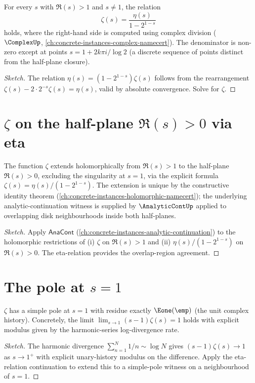 \begin{theorem}
\label{thm:eta-relation-zeta}
For every \(s\) with \(\Re(s) > 1\) and \(s \neq 1\), the relation
$$\zeta(s) = \frac{\eta(s)}{1 - 2^{1-s}}$$
holds, where the right-hand side is computed using complex division (\(\ComplexUp\), \autoref{ch:concrete-instances-complex-namecert}). The denominator is non-zero except at points \(s = 1 + 2k\pi i / \log 2\) (a discrete sequence of points distinct from the half-plane closure).
\end{theorem}
\begin{proof}[Sketch]
The relation \(\eta(s) = (1 - 2^{1-s}) \zeta(s)\) follows from the rearrangement \(\zeta(s) - 2 \cdot 2^{-s} \zeta(s) = \eta(s)\), valid by absolute convergence. Solve for \(\zeta\).
\end{proof}

\section{\(\zeta\) on the half-plane \(\Re(s) > 0\) via eta}

\begin{theorem}[\(\zeta\) on \(\Re(s) > 0\)]
\label{thm:zeta-on-positive-half-plane}
The function \(\zeta\) extends holomorphically from \(\Re(s) > 1\) to the half-plane \(\Re(s) > 0\), excluding the singularity at \(s = 1\), via the explicit formula \(\zeta(s) = \eta(s) / (1 - 2^{1-s})\). The extension is unique by the constructive identity theorem (\autoref{ch:concrete-instances-holomorphic-namecert}); the underlying analytic-continuation witness is supplied by \(\AnalyticContUp\) applied to overlapping disk neighbourhoods inside both half-planes.
\end{theorem}
\begin{proof}[Sketch]
Apply \(\mathsf{AnaCont}\) (\autoref{ch:concrete-instances-analytic-continuation}) to the holomorphic restrictions of (i) \(\zeta\) on \(\Re(s) > 1\) and (ii) \(\eta(s)/(1 - 2^{1-s})\) on \(\Re(s) > 0\). The eta-relation provides the overlap-region agreement.
\end{proof}

\section{The pole at \(s = 1\)}

\begin{theorem}[Simple pole at \(s = 1\) with residue 1]
\label{thm:pole-at-one-residue}
\(\zeta\) has a simple pole at \(s = 1\) with residue exactly \(\Eone(\emp)\) (the unit complex history). Concretely, the limit \(\lim_{s \to 1} (s - 1) \zeta(s) = 1\) holds with explicit modulus given by the harmonic-series log-divergence rate.
\end{theorem}
\begin{proof}[Sketch]
The harmonic divergence \(\sum_{n=1}^N 1/n \sim \log N\) gives \((s - 1) \zeta(s) \to 1\) as \(s \to 1^+\) with explicit unary-history modulus on the difference. Apply the eta-relation continuation to extend this to a simple-pole witness on a neighbourhood of \(s = 1\).
\end{proof}

